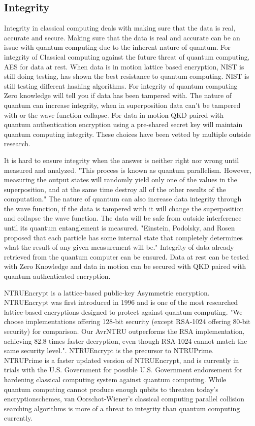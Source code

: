 \documentclass[sigconf]{acmart}
\begin{document}
\subsection{Integrity}
Integrity in classical computing deals with making sure that the data is real, accurate and secure. Making sure that the data is real and accurate can be an issue with quantum computing due to the inherent nature of quantum. For integrity of Classical computing against the future threat of quantum computing, AES for data at rest. When data is in motion lattice based encryption, NIST is still doing testing, has shown the best resistance to quantum computing. NIST is still testing different hashing algorithms. For integrity of quantum computing Zero knowledge will tell you if data has been tampered with. The nature of quantum can increase integrity, when in superposition data can't be tampered with or the wave function collapse. For data in motion QKD paired with quantum authentication encryption using a pre-shared secret key will maintain quantum computing integrity. These choices have been vetted by multiple outside research.   

It is hard to ensure integrity when the answer is neither right nor wrong until measured and analyzed. "This process is known as quantum parallelism. However, measuring the output states will randomly yield only one of the values in the superposition, and at the same time destroy all of the other results of the computation."\cite{rieffel_introduction_1998} The nature of quantum can also increase data integrity through the wave function, if the data is tampered with it will change the superposition and collapse the wave function. The data will be safe from outside interference until its quantum entanglement is measured. "Einstein, Podolsky, and Rosen proposed that each particle has some internal state that completely determines what the result of any given measurement will be."\cite{rieffel_introduction_1998} Integrity of data already retrieved from the quantum computer can be ensured. Data at rest can be tested with Zero Knowledge and data in motion can be secured with QKD paired with quantum authenticated encryption. 

NTRUEncrypt is a lattice-based public-key Asymmetric encryption. NTRUEncrypt was first introduced in 1996 and is one of the most researched lattice-based encryptions designed to protect against quantum computing. "We choose implementations offering 128-bit security (except RSA-1024 offering 80-bit security) for comparison. Our AvrNTRU outperforms the RSA implementation, achieving 82.8 times faster decryption, even though RSA-1024 cannot match the same security level."\cite{cheng_h._lightweight_2021}. NTRUEncrypt is the precursor to NTRUPrime. NTRUPrime is a faster updated version of NTRUEncrypt, and is currently in trials with the U.S. Government for possible U.S. Government endorsement for hardening classical computing system against quantum computing. While quantum computing cannot produce enough qubits to threaten today's encryptionschemes, van Oorschot-Wiener's classical computing parallel collision searching algorithms is more of a threat to integrity than quantum computing currently\cite{mavroeidis_impact_2018}.
\end{document}
